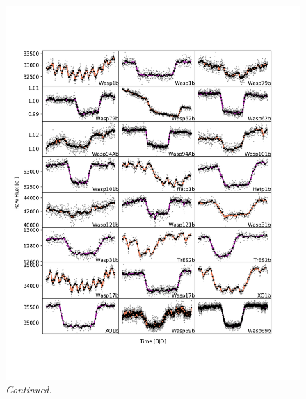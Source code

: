 \begin{subappendices}
  \addtocounter{figure}{-1}
  \begin{figure}
    \includegraphics[width=\textwidth]{RawLighctuves1.pdf}
    \caption{\textit{Continued.}}
  \end{figure}


\end{subappendices}
